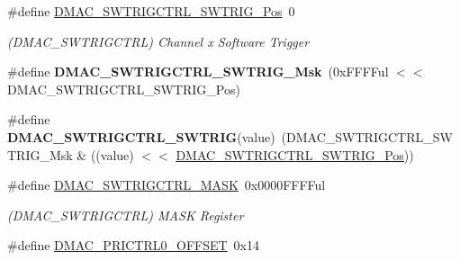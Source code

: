 \begin{DoxyCompactItemize}
\item 
\hypertarget{group___s_a_m_l21___d_m_a_c_gae62c65fde3a4d537e14c13d119192d8b}{}\#define \hyperlink{group___s_a_m_l21___d_m_a_c_gae62c65fde3a4d537e14c13d119192d8b}{D\+M\+A\+C\+\_\+\+S\+W\+T\+R\+I\+G\+C\+T\+R\+L\+\_\+\+S\+W\+T\+R\+I\+G\+\_\+\+Pos}~0\label{group___s_a_m_l21___d_m_a_c_gae62c65fde3a4d537e14c13d119192d8b}

\begin{DoxyCompactList}\small\item\em (D\+M\+A\+C\+\_\+\+S\+W\+T\+R\+I\+G\+C\+T\+R\+L) Channel x Software Trigger \end{DoxyCompactList}\item 
\hypertarget{group___s_a_m_l21___d_m_a_c_gae98a813d57394e89b56b86e480e29418}{}\#define {\bfseries D\+M\+A\+C\+\_\+\+S\+W\+T\+R\+I\+G\+C\+T\+R\+L\+\_\+\+S\+W\+T\+R\+I\+G\+\_\+\+Msk}~(0x\+F\+F\+F\+Ful $<$$<$ D\+M\+A\+C\+\_\+\+S\+W\+T\+R\+I\+G\+C\+T\+R\+L\+\_\+\+S\+W\+T\+R\+I\+G\+\_\+\+Pos)\label{group___s_a_m_l21___d_m_a_c_gae98a813d57394e89b56b86e480e29418}

\item 
\hypertarget{group___s_a_m_l21___d_m_a_c_ga3060f56266fbf1dfd13db1dd9ed9f3ce}{}\#define {\bfseries D\+M\+A\+C\+\_\+\+S\+W\+T\+R\+I\+G\+C\+T\+R\+L\+\_\+\+S\+W\+T\+R\+I\+G}(value)~(D\+M\+A\+C\+\_\+\+S\+W\+T\+R\+I\+G\+C\+T\+R\+L\+\_\+\+S\+W\+T\+R\+I\+G\+\_\+\+Msk \& ((value) $<$$<$ \hyperlink{group___s_a_m_l21___d_m_a_c_gae62c65fde3a4d537e14c13d119192d8b}{D\+M\+A\+C\+\_\+\+S\+W\+T\+R\+I\+G\+C\+T\+R\+L\+\_\+\+S\+W\+T\+R\+I\+G\+\_\+\+Pos}))\label{group___s_a_m_l21___d_m_a_c_ga3060f56266fbf1dfd13db1dd9ed9f3ce}

\item 
\hypertarget{group___s_a_m_l21___d_m_a_c_ga0675eed53ab2c7d9f70d7d35b1bfb19a}{}\#define \hyperlink{group___s_a_m_l21___d_m_a_c_ga0675eed53ab2c7d9f70d7d35b1bfb19a}{D\+M\+A\+C\+\_\+\+S\+W\+T\+R\+I\+G\+C\+T\+R\+L\+\_\+\+M\+A\+S\+K}~0x0000\+F\+F\+F\+Ful\label{group___s_a_m_l21___d_m_a_c_ga0675eed53ab2c7d9f70d7d35b1bfb19a}

\begin{DoxyCompactList}\small\item\em (D\+M\+A\+C\+\_\+\+S\+W\+T\+R\+I\+G\+C\+T\+R\+L) M\+A\+S\+K Register \end{DoxyCompactList}\item 
\hypertarget{group___s_a_m_l21___d_m_a_c_ga7b9c6a7d9f5a2a9ec77fa49304d48e89}{}\#define \hyperlink{group___s_a_m_l21___d_m_a_c_ga7b9c6a7d9f5a2a9ec77fa49304d48e89}{D\+M\+A\+C\+\_\+\+P\+R\+I\+C\+T\+R\+L0\+\_\+\+O\+F\+F\+S\+E\+T}~0x14\label{group___s_a_m_l21___d_m_a_c_ga7b9c6a7d9f5a2a9ec77fa49304d48e89}


\end{DoxyCompactItemize}
